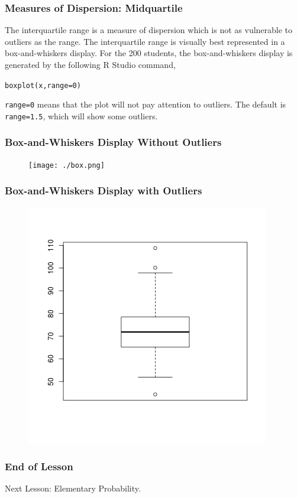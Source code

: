 \documentclass[xcolor=dvipsnames]{beamer}
\begin{document}
\begin{frame}
  \frametitle{Measures of Dispersion: Midquartile}
The \alert{interquartile range} is a measure of dispersion which is not as
vulnerable to outliers as the range. The interquartile range is
visually best represented in a box-and-whiskers display. For the 200
students, the box-and-whiskers display is generated by the following R
Studio command,
\begin{alltt}
boxplot(x,range=0)
\end{alltt}
\texttt{range=0} means that the plot will not pay attention to
outliers. The default is \texttt{range=1.5}, which will show some outliers.
\end{frame}

\begin{frame}
  \frametitle{Box-and-Whiskers Display Without Outliers}
\begin{figure}[h]
\texttt{[image: ./box.png]}
\end{figure}
\end{frame}

\begin{frame}
  \frametitle{Box-and-Whiskers Display with Outliers}
\begin{figure}[h]
\includegraphics[scale=.6]{./box1.png}
\end{figure}
\end{frame}

\begin{frame}
  \frametitle{End of Lesson}
Next Lesson: Elementary Probability.
\end{frame}
\end{document}
